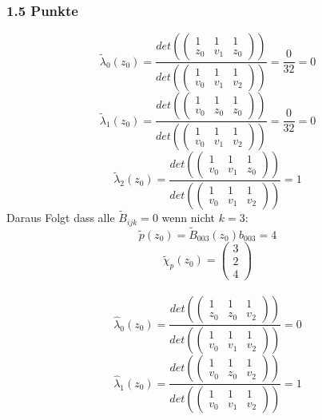 \subsubsection{1.5 Punkte}
$$ \tilde{\lambda}_0(z_0)= \frac{det(\begin{pmatrix}1 & 1 & 1\\ z_0 & v_1 & z_0\end{pmatrix})}{ det(\begin{pmatrix}1 & 1 & 1\\ v_0 & v_1 & v_2\end{pmatrix})} = \frac{0}{32} = 0$$
$$ \tilde{\lambda}_1(z_0)= \frac{det(\begin{pmatrix}1 & 1 & 1\\ v_0 & z_0 & z_0\end{pmatrix})}{ det(\begin{pmatrix}1 & 1 & 1\\ v_0 & v_1 & v_2\end{pmatrix})} = \frac{0}{32} = 0$$
$$ \tilde{\lambda}_2(z_0)= \frac{det(\begin{pmatrix}1 & 1 & 1\\ v_0 & v_1 & z_0\end{pmatrix})}{ det(\begin{pmatrix}1 & 1 & 1\\ v_0 & v_1 & v_2\end{pmatrix})} = 1$$
Daraus Folgt dass alle $\tilde{B}_{ijk} = 0$ wenn nicht $k=3$:\\
$$\tilde{p}(z_0) = \tilde{B}_{003}(z_0) b_{003} = 4$$
$$\tilde{\chi}_p(z_0) = \begin{pmatrix}3\\ 2\\ 4\end{pmatrix}$$
\\
$$ \hat{\lambda}_0(z_0)= \frac{det(\begin{pmatrix}1 & 1 & 1\\ z_0 & z_0 & v_2\end{pmatrix})}{ det(\begin{pmatrix}1 & 1 & 1\\ v_0 & v_1 & v_2\end{pmatrix})} = 0$$
$$ \hat{\lambda}_1(z_0)= \frac{det(\begin{pmatrix}1 & 1 & 1\\ v_0 & z_0 & v_2\end{pmatrix})}{ det(\begin{pmatrix}1 & 1 & 1\\ v_0 & v_1 & v_2\end{pmatrix})} = 1$$
